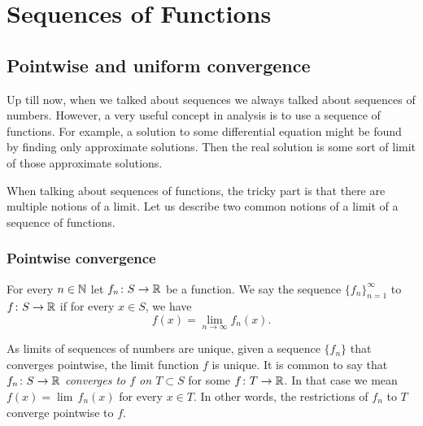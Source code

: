 \chapter{Sequences of Functions} \label{fs:chapter}


\section{Pointwise and uniform convergence}
\label{sec:puconv}


Up till now, when we talked about sequences we always talked about
sequences of numbers.  However, a very useful concept in analysis is to use a
sequence of functions.  For example, a solution to some
differential equation
might be found by finding only approximate solutions.  Then the real solution is
some sort of limit of those approximate solutions.

When talking about sequences of functions, the 
tricky part is that there are multiple notions of a limit.
Let us describe two common
notions of a limit of a sequence of functions.

\subsection{Pointwise convergence}

\begin{defn}
For every $n \in {\mathbb{N}}$
let $f_n \colon S \to {\mathbb{R}}$ be a function.  We say the sequence
$\{ f_n \}_{n=1}^\infty$
\emph{} to $f \colon S \to {\mathbb{R}}$ if for every $x
\in S$,
we have
\begin{equation*}
f(x) =
\lim_{n\to\infty} f_n(x) .
\end{equation*}
\end{defn}

As limits of sequences of numbers are unique, given a sequence $\{ f_n \}$ that
converges pointwise, the limit function $f$ is unique.
It is common to say that $f_n \colon S \to {\mathbb{R}}$
\emph{converges to $f$ on $T \subset S$}
for some $f \colon T \to {\mathbb{R}}$.  In that case we mean 
$f(x) = \lim\, f_n(x)$ for every $x \in T$.  In other words, the
restrictions of $f_n$ to $T$ converge pointwise to $f$.


